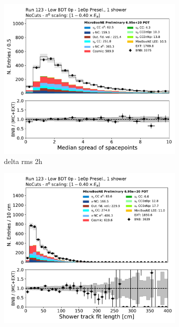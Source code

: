 \begin{figure}[H]
    \centering
    \begin{subfigure}{0.3\textwidth}
    \includegraphics[width=1.0\textwidth]{1e0p/Low_BDT_Sideband/DeltaRMS2h.pdf}
    \caption{delta rms 2h}
    \end{subfigure}
    \begin{subfigure}{0.3\textwidth}
    \includegraphics[width=1.0\textwidth]{1e0p/Low_BDT_Sideband/shr_trk_len.pdf}

\end{subfigure}
\end{figure}
